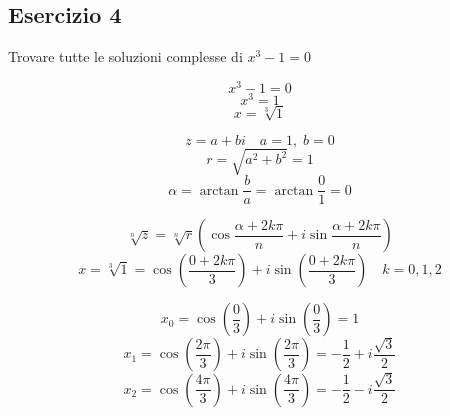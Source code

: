 \documentclass[a4paper]{article}
\theoremstyle{break}
\theoremstyle{break}
\theoremstyle{break}
\theoremstyle{break}
\begin{document}
\subsection{Esercizio 4}
Trovare tutte le soluzioni complesse di \( x^3 - 1 = 0 \) 

\[
  x^3 - 1 = 0
\]
\[
  x^3 = 1
\] 
\[
  x = \sqrt[3]{1}  
\] 

\[
  z = a + bi \quad a = 1,\; b = 0
\] 
\[
  r = \sqrt{a^2 + b^2} = 1
\] 
\[
  \alpha = \arctan{\frac{b}{a}} = \arctan{\frac{0}{1}} = 0
\] 

\vspace{1em}
\[
  \sqrt[n]{z} = \sqrt[n]{r} \left( \cos{\frac{\alpha + 2k\pi}{n}} + i \sin{\frac{\alpha + 2k\pi}{n}} \right)
\] 
\[
  x = \sqrt[3]{1} = \cos\left(\frac{0 + 2k\pi}{3}\right) + i \sin\left(\frac{0 + 2k\pi}{3}\right) \quad k = 0,1,2
\] 

\vspace{1em}
\[
  x_0 = \cos\left(\frac{0}{3}\right) + i \sin\left(\frac{0}{3}\right) = 1
\] 
\[
  x_1 = \cos\left(\frac{2\pi}{3}\right) + i \sin\left(\frac{2\pi}{3}\right) = -\frac{1}{2} + i \frac{\sqrt{3}}{2}
\] 
\[
  x_2 = \cos\left(\frac{4\pi}{3}\right) + i \sin\left(\frac{4\pi}{3}\right) = -\frac{1}{2} - i \frac{\sqrt{3}}{2}
\] 
\end{document}
